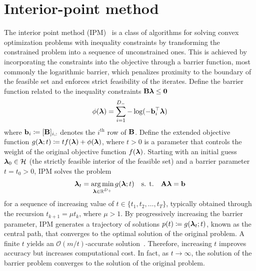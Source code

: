 \section{Interior-point method} 

The interior point method (IPM)~\cite{boyd2004convex} is a class of algorithms for solving convex optimization problems with inequality constraints by transforming the constrained problem into a sequence of unconstrained ones. This is achieved by incorporating the constraints into the objective through a barrier function, most commonly the logarithmic barrier, which penalizes proximity to the boundary of the feasible set and enforces strict feasibility of the iterates. Define the barrier function related to the inequality constraints $\mathbf{B}\boldsymbol{\lambda}\leq \mathbf{0}$
\begin{equation}
	\phi(\boldsymbol{\lambda}) = \sum_{i=1}^{D_-} -\log(-\mathbf{b}_i^\top\boldsymbol{\lambda})
\end{equation}
where $\mathbf{b}_i\coloneqq[\mathbf{B}]_{i,:}$ denotes the $i^\text{th}$ row of $\mathbf{B}$. Define the extended objective function $g(\boldsymbol{\lambda};t)\coloneqq tf(\boldsymbol{\lambda}) + \phi(\boldsymbol{\lambda})$, where $t>0$ is a parameter that controls the weight of the original objective function $f(\boldsymbol{\lambda})$. Starting with an initial guess $\boldsymbol{\lambda}_0\in\mathcal{H}$ (the strictly feasible interior of the feasible set) and a barrier parameter $t=t_0>0$, IPM solves the problem
\begin{equation}\label{eq:central_path}
	\boldsymbol{\lambda}_t = \operatorname*{arg\,min}_{\boldsymbol{\lambda}\in\mathbb{R}^{D_+}} g(\boldsymbol{\lambda};t)\quad \text{s. t.}\quad \mathbf{A}\boldsymbol{\lambda} = \mathbf{b}
\end{equation}
for a sequence of increasing value of $t\in\{t_1,t_2,\ldots,t_T\}$, typically obtained through the recursion $t_{k+1}=\mu t_k$, where $\mu>1$. By progressively increasing the barrier parameter, IPM generates a trajectory of solutions $p(t)\coloneqq g(\boldsymbol{\lambda}_t;t)$, known as the central path, that converges to the optimal solution of the original problem. A finite $t$ yields an $\mathcal{O}(m/t)$-accurate solution~\cite{ipm}. Therefore, increasing $t$ improves accuracy but increases computational cost. In fact, as $t\rightarrow\infty$, the solution of the barrier problem converges to the solution of the original problem. 

